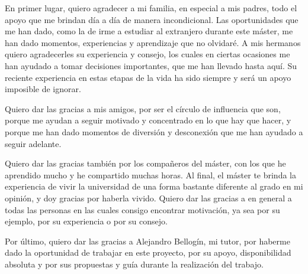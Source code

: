 En primer lugar, quiero agradecer a mi familia, en especial a mis padres, todo el apoyo que me brindan 
día a día de manera incondicional. Las oportunidades que me han dado, como la de irme a estudiar al extranjero durante este máster,
me han dado momentos, experiencias y aprendizaje que no olvidaré. A mis hermanos quiero agradecerles su experiencia y consejo, los cuales en 
ciertas ocasiones me han ayudado a tomar decisiones importantes, que me han llevado hasta aquí. Su reciente experiencia en estas etapas de la vida ha sido siempre y será un apoyo
imposible de ignorar.

Quiero dar las gracias a mis amigos, por ser el círculo de influencia que son, porque 
me ayudan a seguir motivado y concentrado en lo que hay que hacer, y porque me han dado momentos de diversión y desconexión que me han ayudado a seguir adelante.

Quiero dar las gracias también por los compañeros del máster, con los que he aprendido mucho y he compartido muchas horas. Al final,
el máster te brinda la experiencia de vivir la universidad de una forma bastante diferente al grado en mi opinión, y doy gracias por haberla vivido.
Quiero dar las gracias a en general a todas las personas en las cuales consigo encontrar motivación, ya sea por su ejemplo, por su experiencia o por su consejo.

Por último, quiero dar las gracias a Alejandro Bellogín, mi tutor, por haberme dado la oportunidad de trabajar en este proyecto, 
por su apoyo, disponibilidad absoluta y por sus propuestas y guía durante la realización del trabajo.